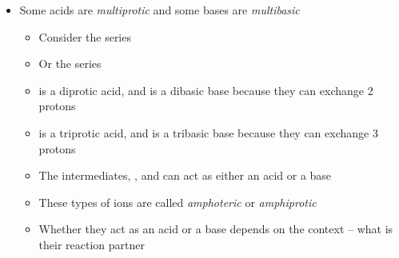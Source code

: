 \documentclass[12pt, openany, letterpaper]{memoir}
\begin{document}
\begin{itemize}
\begin{itemize}
	\end{itemize}
	\item Some acids are \emph{multiprotic} and some bases are \emph{multibasic}
	\begin{itemize}
		\item Consider the series  
		\item Or the series 
		\item {} is a diprotic acid, and  is a dibasic base because they can exchange 2 protons
		\item {} is a triprotic acid, and  is a tribasic base because they can exchange 3 protons
		\item The intermediates, ,  and  can act as either an acid or a base
		\item These types of ions are called \emph{amphoteric} or \emph{amphiprotic}
		\item Whether they act as an acid or a base depends on the context -- what is their reaction partner
	\end{itemize}
\end{itemize}
\end{document}

